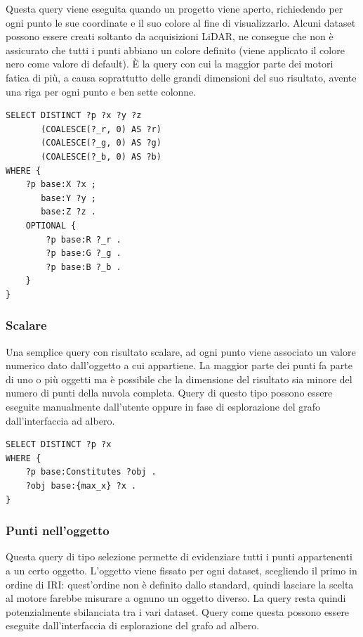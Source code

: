 Questa query viene eseguita quando un progetto viene aperto, richiedendo per ogni punto le sue coordinate e il suo colore al
fine di visualizzarlo.
Alcuni dataset possono essere creati soltanto da acquisizioni LiDAR, ne consegue che non è assicurato che tutti i punti
abbiano un colore definito (viene applicato il colore nero come valore di default).
È la query con cui la maggior parte dei motori fatica di più, a causa soprattutto delle grandi dimensioni del suo risultato,
avente una riga per ogni punto e ben sette colonne.

\begin{lstlisting}[language=SPARQL]
SELECT DISTINCT ?p ?x ?y ?z
       (COALESCE(?_r, 0) AS ?r)
       (COALESCE(?_g, 0) AS ?g)
       (COALESCE(?_b, 0) AS ?b)
WHERE {
    ?p base:X ?x ;
       base:Y ?y ;
       base:Z ?z .
    OPTIONAL {
        ?p base:R ?_r .
        ?p base:G ?_g .
        ?p base:B ?_b .
    }
}
\end{lstlisting}


\subsubsection{Scalare}

Una semplice query con risultato scalare, ad ogni punto viene associato un valore numerico dato dall'oggetto a cui appartiene.
La maggior parte dei punti fa parte di uno o più oggetti ma è possibile che la dimensione del risultato sia minore del numero di
punti della nuvola completa. Query di questo tipo possono essere eseguite manualmente dall'utente oppure in fase di esplorazione
del grafo dall'interfaccia ad albero.

\begin{lstlisting}[language=SPARQL]
SELECT DISTINCT ?p ?x
WHERE {
    ?p base:Constitutes ?obj .
    ?obj base:{max_x} ?x .
}
\end{lstlisting}


\subsubsection{Punti nell'oggetto}

Questa query di tipo selezione permette di evidenziare tutti i punti appartenenti a un certo oggetto.
L'oggetto viene fissato per ogni dataset, scegliendo il primo in ordine di IRI: quest'ordine non è definito
dallo standard, quindi lasciare la scelta al motore farebbe misurare a ognuno un oggetto diverso. La query
resta quindi potenzialmente sbilanciata tra i vari dataset.
Query come questa possono essere eseguite dall'interfaccia di esplorazione del grafo ad albero.

